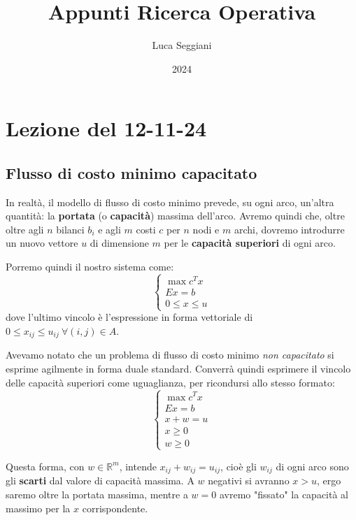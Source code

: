 \documentclass[a4paper,11pt]{article}
\title{Appunti Ricerca Operativa}
\author{Luca Seggiani}
\date{2024}
\begin{document}
\section{Lezione del 12-11-24}

\thispagestyle{empty}
\pagestyle{fancy}

\subsection{Flusso di costo minimo capacitato}
In realtà, il modello di flusso di costo minimo prevede, su ogni arco, un'altra quantità: la \textbf{portata} (o \textbf{capacità}) massima dell'arco.
Avremo quindi che, oltre oltre agli $n$ bilanci $b_i$ e agli $m$ costi $c$ per $n$ nodi e $m$ archi, dovremo introdurre un nuovo vettore $u$ di dimensione $m$ per le \textbf{capacità superiori} di ogni arco.

Porremo quindi il nostro sistema come:
\[
	\begin{cases}
		\max c^T x \\ 
		Ex = b \\ 
		0 \leq x \leq u
	\end{cases}
\]
dove l'ultimo vincolo è l'espressione in forma vettoriale di $0 \leq x_{ij} \leq u_{ij} \ \forall (i, j) \in A$.

Avevamo notato che un problema di flusso di costo minimo \textit{non capacitato} si esprime agilmente in forma duale standard. 
Converrà quindi esprimere il vincolo delle capacità superiori come uguaglianza, per ricondursi allo stesso formato:
\[
	\begin{cases}
		\max c^T x \\ 
		Ex = b \\
		x + w = u \\ 
		x \geq 0 \\ 
		w \geq 0
	\end{cases}
\]

Questa forma, con $w \in \mathbb{R}^m$, intende $x_ {ij} + w_{ij} = u_{ij}$, cioè gli $w_{ij}$ di ogni arco sono gli \textbf{scarti} dal valore di capacità massima. A $w$ negativi si avranno $x > u$, ergo saremo oltre la portata massima, mentre a $w = 0$ avremo "fissato" la capacità al massimo per la $x$ corrispondente.
\end{document}
